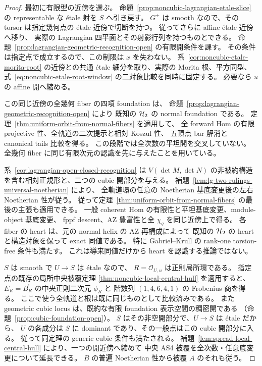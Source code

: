 \begin{proof}
最初に有限型の近傍を選ぶ。
命題~\ref{prop:noncubic-lagrangian-etale-slice} の representable な
\texorpdfstring{\'etale}{etale} 射を $S$ へ引き戻す。
$G^+$ は smooth なので、その torsor は指定幾何点の
\texorpdfstring{\'etale}{etale} 近傍で切断を持つ。
従ってさらに affine \texorpdfstring{\'etale}{etale} 近傍へ移り、
実際の Lagrangian 四平面とその射影行列を持つものとできる。
命題~\ref{prop:lagrangian-geometric-recognition-open} の有限開条件を課す。
その条件は指定点で成立するので、この制限は $x$ を失わない。
系~\ref{cor:noncubic-etale-morita-root} の近傍との共通
\texorpdfstring{\'etale}{etale} 細分を取り、実際の Morita 根、平方同型、
式~\ref{eq:noncubic-etale-root-window} の二対象比較を同時に固定する。
必要なら $u$ の affine 開へ縮める。

この同じ近傍の全幾何 fiber の四項 foundation は、
命題~\ref{prop:lagrangian-geometric-recognition-open} により
既知の $\mathcal H_2$ の normal foundation である。
定理~\ref{thm:uniform-orbit-from-normal-fibers} を適用して、
全 forward Hom の有限 projective 性、全軌道の二次提示と相対 Koszul 性、
五頂点 bar 解消と canonical tails 比較を得る。
この段階では全次数の平坦開を交叉していない。
全幾何 fiber に同じ有限次元の認識を先に与えたことを用いている。

系~\ref{cor:lagrangian-open-closed-recognition} は
$V(\det M,\det N)$ の非被約構造を含む相対正規形と、二つの cubic 開部分を与える。
補題~\ref{lem:lg-two-rulings-universal-noetherian} により、
全軌道環の任意の Noetherian 基底変更後の左右 Noetherian 性が従う。
従って定理~\ref{thm:uniform-orbit-from-normal-fibers} の最後の主張も適用できる。
一般 coherent Hom の有限性と平坦基底変更、module-object 基底変更、
fppf descent、AZ 豊富性と全 $\chi_q$ を同じ近傍上で得る。
各 fiber の heart は、元の normal helix の AZ 再構成によって
既知の $\mathcal H_2$ の heart と構造対象を保って exact 同値である。
特に Gabriel--Krull の rank-one torsion-free 条件も満たす。
これは導来同値だけから heart を認識する推論ではない。

$S$ は smooth で $U\to S$ は \texorpdfstring{\'etale}{etale} なので、
$R=\mathcal O_{U,u}$ は正則局所環である。
指定点の既存の局所中央被覆定理
\ref{thm:noncubic-local-central-hull} を適用すると、
$E_R=B_R^!$ の中央正則二次元 $\phi_R$ と
階数列 $(1,4,6,4,1)$ の Frobenius 商を得る。
ここで使う全軌道と根は既に同じものとして比較済みである。
また geometric cubic locus は、既約な有限 foundation 表示空間の稠密開である
（命題~\ref{prop:cubic-foundation-open}）。
$S$ はその非空開部分で、$U\to S$ は \texorpdfstring{\'etale}{etale} だから、
$U$ の各成分は $S$ に dominant であり、その一般点はこの cubic 開部分に入る。
従って同定理の generic cubic 条件も満たされる。
補題~\ref{lem:spread-local-central-hull} により、一つの開近傍へ縮めて
中央 AS4 被覆を全次数・任意底変更について延長できる。
$B$ の普遍 Noetherian 性から被覆 $A$ のそれも従う。


\end{proof}
